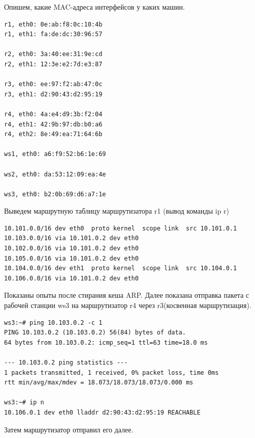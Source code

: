 \documentclass[a4paper,12pt]{article}
\begin{document}

Опишем, какие MAC-адреса интерфейсов у каких машин.

\begin{Verbatim}
r1, eth0: 0e:ab:f8:0c:10:4b
r1, eth1: fa:de:dc:30:96:57

r2, eth0: 3a:40:ee:31:9e:cd
r2, eth1: 12:3e:e2:7d:e3:87

r3, eth0: ee:97:f2:ab:47:0c
r3, eth1: d2:90:43:d2:95:19

r4, eth0: 4a:e4:d9:3b:f2:04
r4, eth1: 42:9b:97:db:b0:a6
r4, eth2: 8e:49:ea:71:64:6b

ws1, eth0: a6:f9:52:b6:1e:69

ws2, eth0: da:53:12:09:ea:4e

ws3, eth0: b2:0b:69:d6:a7:1e
\end{Verbatim}

Выведем маршрутную таблицу маршрутизатора r1 (вывод команды ip r)

\begin{Verbatim}
10.101.0.0/16 dev eth0  proto kernel  scope link  src 10.101.0.1 
10.103.0.0/16 via 10.101.0.2 dev eth0 
10.102.0.0/16 via 10.101.0.2 dev eth0 
10.105.0.0/16 via 10.101.0.2 dev eth0 
10.104.0.0/16 dev eth1  proto kernel  scope link  src 10.104.0.1 
10.106.0.0/16 via 10.101.0.2 dev eth0 
\end{Verbatim}

Показаны опыты после стирания кеша ARP.
Далее показана отправка пакета с рабочей станции ws3 на маршрутизатор r4 через r3(косвенная маршрутизация). 

\begin{Verbatim}
ws3:~# ping 10.103.0.2 -c 1
PING 10.103.0.2 (10.103.0.2) 56(84) bytes of data.
64 bytes from 10.103.0.2: icmp_seq=1 ttl=63 time=18.0 ms

--- 10.103.0.2 ping statistics ---
1 packets transmitted, 1 received, 0% packet loss, time 0ms
rtt min/avg/max/mdev = 18.073/18.073/18.073/0.000 ms

ws3:~# ip n
10.106.0.1 dev eth0 lladdr d2:90:43:d2:95:19 REACHABLE
\end{Verbatim}

Затем маршрутизатор отправил его далее.
\end{document}
